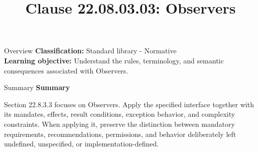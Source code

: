 \documentclass[10pt,letterpaper]{article}
\title{Clause 22.08.03.03: Observers}
\author{}
\date{}
\begin{document}
\maketitle
\begin{CornellOverviewBox}{Overview}
\textbf{Classification:} Standard library - Normative\\[2pt]
\textbf{Learning objective:} Understand the rules, terminology, and semantic consequences associated with Observers.
\end{CornellOverviewBox}\begin{CornellSummaryBox}{Summary}
{\sffamily\bfseries\color{Accent} Summary}\par\vspace{3pt}Section 22.8.3.3 focuses on Observers. Apply the specified interface together with its mandates, effects, result conditions, exception behavior, and complexity constraints. When applying it, preserve the distinction between mandatory requirements, recommendations, permissions, and behavior deliberately left undefined, unspecified, or implementation-defined.
\end{CornellSummaryBox}
\end{document}
